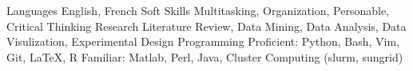 \begin{cvskills}
	\cvskill
		{Languages}
		{English, French}
	\cvskill
		{Soft Skills}
        {Multitasking, Organization, Personable, Critical Thinking}
	\cvskill
		{Research}
        {Literature Review, Data Mining, Data Analysis, Data Visulization, Experimental Design}
	\cvskill
    	{Programming} %
    	{Proficient: Python, Bash, Vim, Git, LaTeX, R} %
	\cvskill
    	{} %
        {Familiar: Matlab, Perl, Java, Cluster Computing (slurm, sungrid)} %
\end{cvskills}
